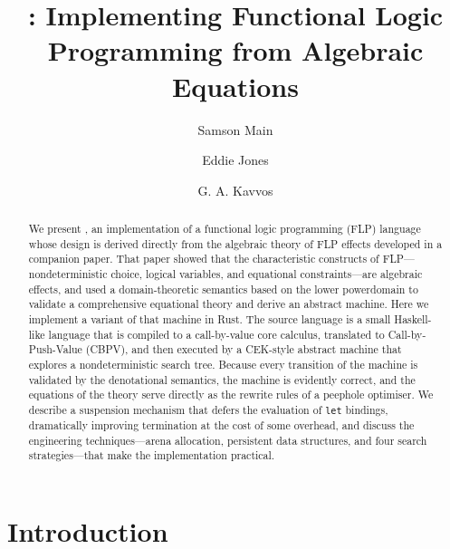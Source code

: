 \documentclass[
  acmsmall,
  screen,
  natbib=false,
]{acmart}
\begin{document}
\title{\Gweek{}: Implementing Functional Logic Programming from Algebraic Equations}

\author{Samson Main}

\author{Eddie Jones}

\author{G. A. Kavvos}

\begin{abstract}

We present \Gweek{}, an implementation of a functional logic programming (FLP)
language whose design is derived directly from the algebraic theory of FLP
effects developed in a companion paper. That paper showed that the
characteristic constructs of FLP---nondeterministic choice, logical variables,
and equational constraints---are algebraic effects, and used a domain-theoretic
semantics based on the lower powerdomain to validate a comprehensive equational
theory and derive an abstract machine. Here we implement a variant of that
machine in Rust. The source language is a small Haskell-like language that is
compiled to a call-by-value core calculus, translated to Call-by-Push-Value
(CBPV), and then executed by a CEK-style abstract machine that explores a
nondeterministic search tree. Because every transition of the machine is
validated by the denotational semantics, the machine is evidently correct, and
the equations of the theory serve directly as the rewrite rules of a peephole
optimiser. We describe a suspension mechanism that defers the evaluation of
\texttt{let} bindings, dramatically improving termination at the cost of some
overhead, and discuss the engineering techniques---arena allocation, persistent
data structures, and four search strategies---that make the implementation
practical.

\end{abstract}

\maketitle

\section{Introduction}
  \label{section:introduction}
  
\end{document}
